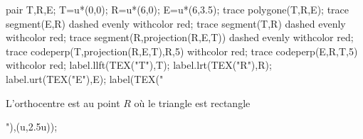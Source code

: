 \begin{corrige}
   \begin{Geometrie}[CoinBG={(-0.5u,-3u)}]
      pair T,R,E;
      T=u*(0,0);
      R=u*(6,0);
      E=u*(6,3.5);
      trace polygone(T,R,E);
      trace segment(E,R) dashed evenly withcolor red;      
      trace segment(T,R) dashed evenly withcolor red;
      trace segment(R,projection(R,E,T)) dashed evenly withcolor red;
      trace codeperp(T,projection(R,E,T),R,5) withcolor red;
      trace codeperp(E,R,T,5) withcolor red;      
      label.llft(TEX("T"),T);
      label.lrt(TEX("R"),R);
      label.urt(TEX("E"),E);
      label(TEX("\parbox{3cm}{L'orthocentre est {\red au point $R$} où le triangle est rectangle}"),(u,2.5u));
   \end{Geometrie}
\end{corrige}
